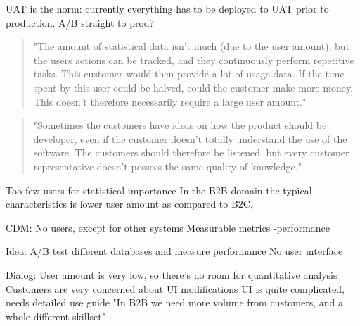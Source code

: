 \documentclass[english]{tktltiki2}
\theoremstyle{definition}
\theoremstyle{remark}
\begin{document}
UAT is the norm:
currently everything has to be deployed to UAT prior to production. A/B straight to prod?

\begin{quote}
"The amount of statistical data isn't much (due to the user amount), but the users actions can be tracked, and they continuously perform repetitive tasks. This customer would then provide a lot of usage data. If the time spent by this user could be halved, could the customer make more money. This doesn't therefore necessarily require a large user amount."
\end{quote}

\begin{quote}
"Sometimes the customers have ideas on how the product should be developer, even if the customer doesn't totally understand the use of the software. The customers should therefore be listened, but every customer representative doesn't possess the same quality of knowledge." 
\end{quote}


Too few users for statistical importance
In the B2B domain the typical characteristics is lower user amount as compared to B2C, 




CDM: 
No users, except for other systems
Measurable metrics
-performance

Idea: A/B test different databases and measure performance
No user interface

Dialog:
User amount is very low, so there's no room for quantitative analysis
Customers are very concerned about UI modifications
UI is quite complicated, needs detailed use guide
"In B2B we need more volume from customers, and a whole different skillset"
\end{document}
